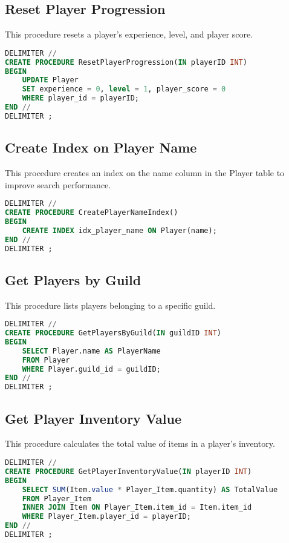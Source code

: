 \documentclass{article}
\begin{document}
\subsection{Reset Player Progression}
This procedure resets a player's experience, level, and player score.
\begin{lstlisting}[language=sql,caption=Reset Player Progression]
DELIMITER //
CREATE PROCEDURE ResetPlayerProgression(IN playerID INT)
BEGIN
    UPDATE Player
    SET experience = 0, level = 1, player_score = 0
    WHERE player_id = playerID;
END //
DELIMITER ;
\end{lstlisting}

\subsection{Create Index on Player Name}
This procedure creates an index on the name column in the Player table to improve search performance.
\begin{lstlisting}[language=sql,caption=Create Index on Player Name]
DELIMITER //
CREATE PROCEDURE CreatePlayerNameIndex()
BEGIN
    CREATE INDEX idx_player_name ON Player(name);
END //
DELIMITER ;
\end{lstlisting}

\subsection{Get Players by Guild}
This procedure lists players belonging to a specific guild.
\begin{lstlisting}[language=sql,caption=Get Players by Guild]
DELIMITER //
CREATE PROCEDURE GetPlayersByGuild(IN guildID INT)
BEGIN
    SELECT Player.name AS PlayerName
    FROM Player
    WHERE Player.guild_id = guildID;
END //
DELIMITER ;
\end{lstlisting}

\subsection{Get Player Inventory Value}
This procedure calculates the total value of items in a player's inventory.
\begin{lstlisting}[language=sql,caption=Get Player Inventory Value]
DELIMITER //
CREATE PROCEDURE GetPlayerInventoryValue(IN playerID INT)
BEGIN
    SELECT SUM(Item.value * Player_Item.quantity) AS TotalValue
    FROM Player_Item
    INNER JOIN Item ON Player_Item.item_id = Item.item_id
    WHERE Player_Item.player_id = playerID;
END //
DELIMITER ;
\end{lstlisting}
\end{document}
